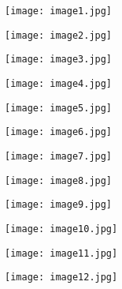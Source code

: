 \begin{figure}[H]
\centering
\texttt{[image: image1.jpg]}
\end{figure}
\begin{figure}[H]
\centering
\texttt{[image: image2.jpg]}
\end{figure}
\begin{figure}
\centering
\texttt{[image: image3.jpg]}
\end{figure}
\begin{figure}
\centering
\texttt{[image: image4.jpg]}
\end{figure}
\begin{figure}
\centering
\texttt{[image: image5.jpg]}
\end{figure}
\begin{figure}
\centering
\texttt{[image: image6.jpg]}
\end{figure}
\begin{figure}
\centering
\texttt{[image: image7.jpg]}
\end{figure}
\begin{figure}
\centering
\texttt{[image: image8.jpg]}
\end{figure}
\begin{figure}
\centering
\texttt{[image: image9.jpg]}
\end{figure}
\begin{figure}
\centering
\texttt{[image: image10.jpg]}
\end{figure}
\begin{figure}
\centering
\texttt{[image: image11.jpg]}
\end{figure}
\begin{figure}
\centering
\texttt{[image: image12.jpg]}
\end{figure}
